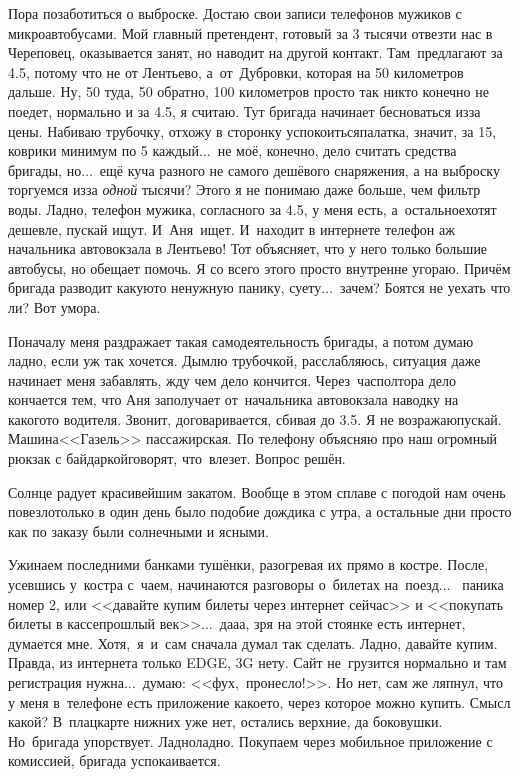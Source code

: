 Пора позаботиться о выброске. Достаю свои записи телефонов мужиков с микроавтобусами. Мой главный претендент, готовый за 3 тысячи отвезти нас в Череповец, оказывается занят, но наводит на другой контакт. Там~предлагают за 4.5, потому что не от Лентьево, а~от~Дубровки, которая на 50 километров дальше. Ну, 50 туда, 50 обратно, 100 километров просто так никто конечно не поедет, нормально и за 4.5, я считаю. Тут бригада начинает бесноваться из\sdash за цены. Набиваю трубочку, отхожу в сторонку успокоиться\mdash палатка, значит, за 15, коврики минимум по 5 каждый$\ldots$~не моё, конечно, дело считать средства бригады, но$\ldots$~ещё куча разного не самого дешёвого снаряжения, а на выброску торгуемся из\sdash за \textit{одной} тысячи? Этого я не понимаю даже больше, чем фильтр воды. Ладно, телефон  мужика, согласного за 4.5, у  меня есть, а~остальное\mdash хотят дешевле, пускай ищут. И~Аня~ищет. И~находит в интернете телефон аж начальника автовокзала в Лентьево! Тот объясняет, что у него только большие автобусы, но обещает помочь. Я со всего этого просто внутренне угораю. Причём бригада разводит какую\sdash то ненужную панику, суету$\ldots$~зачем? Боятся не уехать что ли? Вот умора.

Поначалу меня раздражает такая самодеятельность бригады, а потом думаю ладно, если уж так хочется. Дымлю трубочкой, расслабляюсь, ситуация даже начинает меня забавлять, жду чем дело кончится. Через~час\sdash полтора дело кончается тем, что Аня заполучает от~начальника автовокзала наводку на какого\sdash то водителя. Звонит, договаривается, сбивая до 3.5. Я не возражаю\mdash пускай. Машина\mdash <<Газель>> пассажирская. По телефону объясняю про наш огромный рюкзак с байдаркой\mdash говорят, что~влезет. Вопрос решён.

Солнце радует красивейшим закатом. Вообще в этом сплаве с погодой нам очень повезло\mdash только в один день было подобие дождика с утра, а остальные дни просто как по заказу были солнечными и ясными.

Ужинаем последними банками тушёнки, разогревая их прямо в костре. После, усевшись у~костра с~чаем, начинаются разговоры о~билетах на~поезд$\ldots$~ паника номер 2, или <<давайте купим билеты через интернет сейчас>> и <<покупать билеты в кассе\mdash прошлый век>>$\ldots$~да\sdash а\sdash а, зря на этой стоянке есть интернет, думается мне. Хотя,~я~и~сам сначала думал так сделать. Ладно, давайте купим. Правда, из интернета только EDGE, 3G нету. Сайт не~грузится нормально и там регистрация нужна$\ldots$~думаю: <<фух,~пронесло!>>. Но нет, сам же ляпнул, что у меня в~телефоне есть приложение какое\sdash то, через которое можно купить. Смысл какой? В~плацкарте нижних уже нет, остались верхние, да боковушки. Но~бригада упорствует. Ладно\sdash ладно. Покупаем через мобильное приложение с комиссией, бригада успокаивается. 

